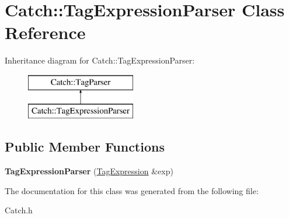 \hypertarget{class_catch_1_1_tag_expression_parser}{\section{Catch\-:\-:Tag\-Expression\-Parser Class Reference}
\label{class_catch_1_1_tag_expression_parser}
}
Inheritance diagram for Catch\-:\-:Tag\-Expression\-Parser\-:\begin{figure}[H]
\begin{center}
\leavevmode
\includegraphics[height=2.000000cm]{class_catch_1_1_tag_expression_parser}
\end{center}
\end{figure}
\subsection*{Public Member Functions}
\begin{DoxyCompactItemize}
\item 
\hypertarget{class_catch_1_1_tag_expression_parser_aeca33975125f6e824c2351312115a8a8}{{\bfseries Tag\-Expression\-Parser} (\hyperlink{class_catch_1_1_tag_expression}{Tag\-Expression} \&exp)}\label{class_catch_1_1_tag_expression_parser_aeca33975125f6e824c2351312115a8a8}

\end{DoxyCompactItemize}


The documentation for this class was generated from the following file\-:\begin{DoxyCompactItemize}
\item 
Catch.\-h\end{DoxyCompactItemize}
